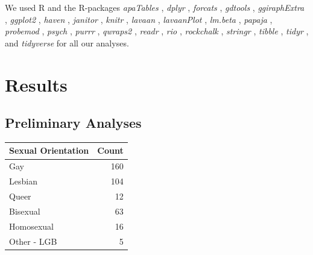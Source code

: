 \documentclass[
  english,
  man,floatsintext]{apa6}
\begin{document}
We used R \autocite[Version 4.0.3;][]{R-base} and the R-packages \emph{apaTables} \autocite[Version 2.0.5;][]{R-apaTables}, \emph{dplyr} \autocite[Version 1.0.2;][]{R-dplyr}, \emph{forcats} \autocite[Version 0.5.0;][]{R-forcats}, \emph{gdtools} \autocite[Version 0.2.2;][]{R-gdtools}, \emph{ggiraphExtra} \autocite[Version 0.3.0;][]{R-ggiraphExtra}, \emph{ggplot2} \autocite[Version 3.3.2;][]{R-ggplot2}, \emph{haven} \autocite[Version 2.3.1;][]{R-haven}, \emph{janitor} \autocite[Version 2.0.1;][]{R-janitor}, \emph{knitr} \autocite[Version 1.30;][]{R-knitr}, \emph{lavaan} \autocites[Version 0.6.7;][]{R-lavaan,R-lavaanPlot}, \emph{lavaanPlot} \autocite[Version 0.5.1;][]{R-lavaanPlot}, \emph{lm.beta} \autocite[Version 1.5.1;][]{R-lm.beta}, \emph{papaja} \autocite[Version 0.1.0.9997;][]{R-papaja}, \emph{probemod} \autocite[Version 0.2.1;][]{R-probemod}, \emph{psych} \autocite[Version 2.0.9;][]{R-psych}, \emph{purrr} \autocite[Version 0.3.4;][]{R-purrr}, \emph{qwraps2} \autocite[Version 0.5.0;][]{R-qwraps2}, \emph{readr} \autocite[Version 1.3.1;][]{R-readr}, \emph{rio} \autocite[Version 0.5.16;][]{R-rio}, \emph{rockchalk} \autocite[Version 1.8.144;][]{R-rockchalk}, \emph{stringr} \autocite[Version 1.4.0;][]{R-stringr}, \emph{tibble} \autocite[Version 3.0.4;][]{R-tibble}, \emph{tidyr} \autocite[Version 1.1.2;][]{R-tidyr}, and \emph{tidyverse} \autocite[Version 1.3.0;][]{R-tidyverse} for all our analyses.

\hypertarget{results}{%
\section{Results}\label{results}}

\hypertarget{preliminary-analyses}{%
\subsection{Preliminary Analyses}\label{preliminary-analyses}}

\begin{tabular}{l|r}
\hline
Sexual Orientation & Count\\
\hline
Gay & 160\\
\hline
Lesbian & 104\\
\hline
Queer & 12\\
\hline
Bisexual & 63\\
\hline
Homosexual & 16\\
\hline
Other - LGB & 5\\
\hline
\end{tabular}
\end{document}
